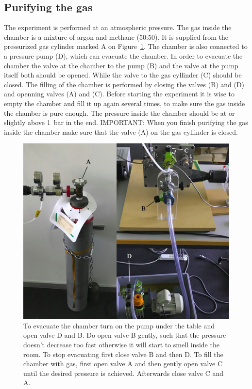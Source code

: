 \documentclass[12pt]{article}
\begin{document}
\subsection{Purifying the gas}
The experiment is performed at an atmospheric pressure. The gas inside the chamber is a mixture of argon and methane (50:50). It is supplied from the pressurized gas cylinder marked A on Figure~\ref{fig:gas}. The chamber is also connected to a pressure pump (D), which can evacuate the chamber. In order to evacuate the chamber the valve at the chamber to the pump (B) and the valve at the pump itself both should be opened. While the valve to the gas cyllinder (C) should be closed. The filling of the chamber is performed by closing the valves (B) and (D) and openning valves (A) and (C). Before starting  the experiment it is wise to empty the chamber and fill it up again several times, to make sure the gas inside the chamber is pure enough. The pressure inside the chamber should be at or slightly above  \SI{1}{\bar} in the end. IMPORTANT: When you finish purifying the gas inside the chamber make sure that the valve (A) on the gas cyllinder is closed.

\begin{figure}[!h]
	\includegraphics[width=12cm]{pics/valve}
	\centering
	\caption{To evacuate the chamber turn on the pump under the table and open valve D and B. Do open valve B gently, such that the pressure doesn't decrease too fast otherwise it will start to smell inside the room.  To stop evacuating first close valve B and then D. To fill the chamber with gas, first open valve A and then gently open valve C until the desired pressure is achieved. Afterwards close valve C and A.}
	\label{fig:gas}
\end{figure}
\end{document}
